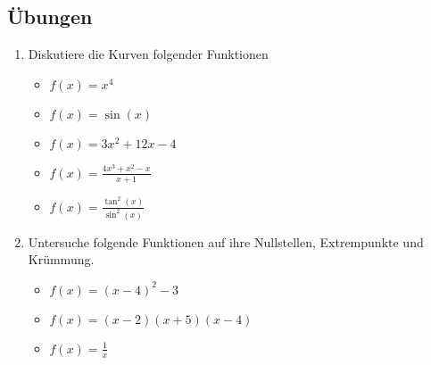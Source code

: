  \subsection{Übungen}
 \begin{enumerate}
 \item Diskutiere die Kurven folgender Funktionen
 \begin{itemize}
 \item $f(x)=x^4$
 \item $f(x)=\sin(x)$
 \item $f(x)=3x^2 + 12x - 4$
 \item $f(x)=\frac{4x^3 + x^2 - x}{x+1}$
 \item $f(x)=\frac{\tan^2(x)}{\sin^2(x)}$
 \end{itemize}
 \item Untersuche folgende Funktionen auf ihre Nullstellen, Extrempunkte und Krümmung.
 \begin{itemize}
 \item $f(x)=(x-4)^2-3$
 \item $f(x)=(x-2)(x+5)(x-4)$
 \item $f(x)=\frac{1}{x}$
 \end{itemize}
 \end{enumerate}
 
 
